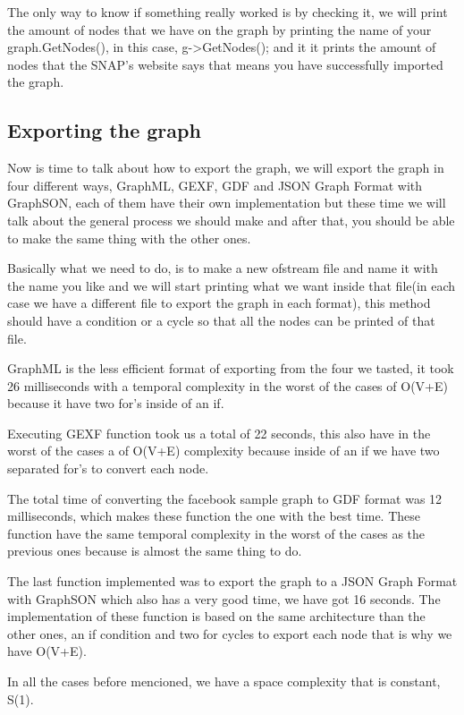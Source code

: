 \documentclass{sig-alternate-05-2015}
\begin{document}
The only way to know if something really worked is by checking it, we
will print the amount of nodes that we have on the graph by printing
the name of your graph.GetNodes(), in this case, g->GetNodes(); and it
it prints the amount of nodes that the SNAP's website says that means you
have successfully imported the graph.


\subsection{Exporting the graph}
Now is time to talk about how to export the graph, we will
export the graph in four different ways, GraphML, GEXF,
GDF and JSON Graph Format with GraphSON, each of them have their own
implementation but these time we will talk about the general
process we should make and after that, you should be able
to make the same thing with the other ones.

Basically what we need to do, is to make a new ofstream file
and name it with the name you like and we will start printing
what we want inside that file(in each case we have
a different file to export the graph in each format),
this method should have a condition or a cycle so
that all the nodes can be printed  of that file.

GraphML is the less efficient format of exporting from
the four we tasted, it took 26 milliseconds with a
temporal complexity in the worst of the cases of O(V+E)
because it have two for's inside of an if.

Executing GEXF function took us a total of 22 seconds,
this also have in the worst of the cases a of O(V+E)
complexity because inside of an if we have two separated
for's to convert each node.

The total time of converting the facebook sample graph
to GDF format was 12 milliseconds, which makes these
function the one with the best time. These function
have the same temporal complexity in the worst of the cases
as the previous ones because is almost the same thing
to do.

The last function implemented was to export the graph
to a JSON Graph Format with GraphSON which also has
a very good time, we have got 16 seconds. The
implementation of these function is based on the same
architecture than the other ones, an if condition
and two for cycles to export each node that is why
we have O(V+E).

In all the cases before mencioned, we have a space
complexity that is constant, S(1).
\end{document}
